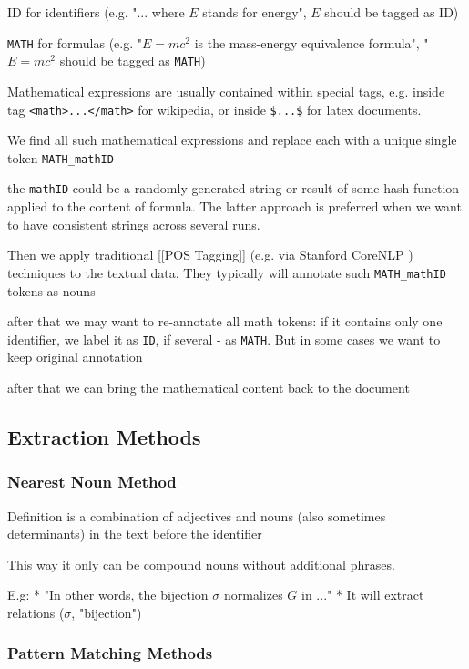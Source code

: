 ID for identifiers (e.g. "... where $E$ stands for energy", $E$ should be tagged as ID)

\verb|MATH| for formulas (e.g. "$E = mc^2$ is the mass-energy equivalence formula", "$E = mc^2$ should be tagged as \verb|MATH|)

Mathematical expressions are usually contained within special tags, e.g. inside
tag \verb|<math>...</math>| for wikipedia, or inside \verb|$...$| for 
latex documents.

We find all such mathematical expressions and replace each with a unique single token \verb|MATH_mathID|

the \verb|mathID| could be a randomly generated string or result of some hash function 
applied to the content of formula. The latter approach is preferred when we want 
to have consistent strings across several runs.

Then we apply traditional [[POS Tagging]] (e.g. via Stanford 
CoreNLP \cite{manning2014stanford})
techniques to the textual data. They typically will annotate such \verb|MATH_mathID|
tokens as nouns

after that we may want to re-annotate all math tokens: if it contains only 
one identifier, we label it as \verb|ID|, if several - as \verb|MATH|. But in some cases 
we want to keep original annotation

after that we can bring the mathematical content back to the document



\subsection{Extraction Methods}
\subsubsection{Nearest Noun Method}
Definition is a combination of adjectives and nouns (also sometimes determinants) in the text before the identifier

\cite{grigore2009towards}
\cite{yokoi2011contextual}


This way it only can be compound nouns without additional phrases.


E.g:
* "In other words, the bijection $\sigma$ normalizes $G$ in ..."
* It will extract relations ($\sigma$, "bijection")



\subsubsection{Pattern Matching Methods}

